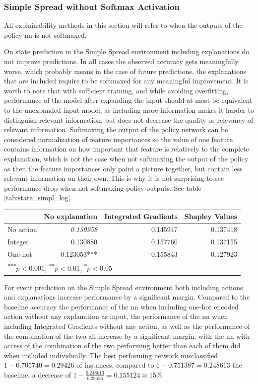 \documentclass[UKenglish]{uiomasterthesis}
\begin{document}
\subsubsection{Simple Spread without Softmax Activation}
All explainability methods in this section will refer to when the outputs of the policy \ac{nn} is not softmaxed.

On state prediction in the Simple Spread environment including explanations do not improve predictions. In all cases the observed accuracy gets meaningfully worse, which probably means in the case of future predictions, the explanations that are included require to be softmaxed for any meaningful improvement. It is worth to note that with sufficient training, and while avoiding overfitting, performance of the model after expanding the input should at most be equivalent to the unexpanded input model, as including more information makes it harder to distinguish relevant information, but does not decrease the quality or relevancy of relevant information. Softmaxing the output of the policy network can be considered normalization of feature importances so the value of one feature contains information on how important that feature is relatively to the complete explanation, which is not the case when not softmaxing the output of the policy as then the feature importances only paint a picture together, but contain less relevant information on their own. This is why it is not surprising to see performance drop when not softmaxing policy outputs. See table \ref{tab:state_simpl_log}.

\begin{center}
\label{tab:state_simpl_log}
\begin{tabular}{lrrr}
\toprule
 & No explanation & Integrated Gradients & Shapley Values \\
\midrule
No action & \textit{0.130958} & 0.145947 & 0.137418 \\
Integer & 0.130880 & 0.157760 & 0.137155 \\
One-hot & 0.123053*** & 0.155843 & 0.127923 \\
\bottomrule
\multicolumn{3}{l}{\textsuperscript{***}$p<0.001$, 
  \textsuperscript{**}$p<0.01$, 
  \textsuperscript{*}$p<0.05$}
\end{tabular}
\end{center}

For event prediction on the Simple Spread environment both including actions and explanations increase performance by a significant margin. Compared to the baseline accuracy the performance of the \ac{nn} when including one-hot encoded action without any explanation as input, the performance of the \ac{nn} when including Integrated Gradients without any action, as well as the performance of the combination of the two all increase by a significant margin, with the \ac{nn} with access of the combination of the two performing better than each of them did when included individually. The best performing network misclassified $1-0.705740 = 0.29426$ of instances, compared to $1-0.751387 = 0.248613$ the baseline, a decrease of $1-\frac{0.248613}{0.29426} = 0.155124 \approx 15\%$
\end{document}
